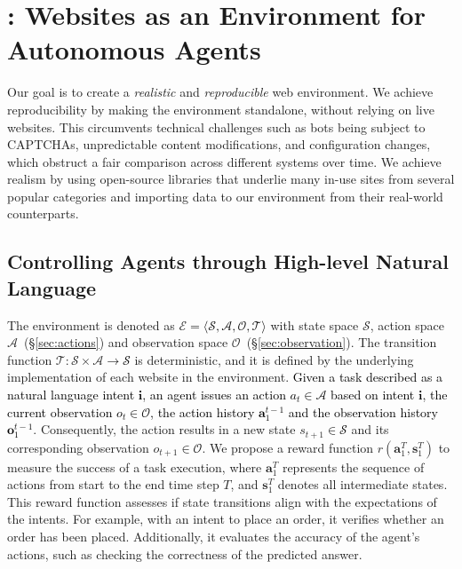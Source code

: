 \documentclass{article}
\newcommand{\rebuttal}[1]{\textcolor{black}{#1}}%
\begin{document}
\section{\ours: Websites as an Environment for Autonomous Agents}\label{sec:webarena}
Our goal is to create a \emph{realistic} and \emph{reproducible} web environment. We achieve reproducibility by making the environment standalone, without relying on live websites. This circumvents technical challenges such as bots being subject to CAPTCHAs, unpredictable content modifications, and configuration changes, which obstruct a fair comparison across different systems over time. We achieve realism by using open-source libraries that underlie many in-use sites from several popular categories and importing data to our environment from their real-world counterparts.

\subsection{Controlling Agents through High-level Natural Language}
The \ours environment is denoted as $\mathcal{E}$\textcolor{black}{$=\langle \mathcal{S},\mathcal{A},\mathcal{O},\mathcal{T} \rangle$} with state space $\mathcal{S}$, action space $\mathcal{A}$~(\S\ref{sec:actions}) and observation space $\mathcal{O}$~(\S\ref{sec:observation}).
The transition function $\mathcal{T}: \mathcal{S} \times \mathcal{A}$\textcolor{black}{$\longrightarrow \mathcal{S}$} is deterministic, and it is defined by the underlying implementation of each website in the environment.
\rebuttal{Given a task described as a natural language intent $\mathbf{i}$, an agent issues an action $a_t$\textcolor{black}{$\in \mathcal{A}$} based on intent $\mathbf{i}$, the current observation $o_t$\textcolor{black}{$\in \mathcal{O}$}, the action history $\mathbf{a}_{1}^{t-1}$ and the observation history~$\mathbf{o}_{1}^{t-1}$}.
Consequently, the action results in a new state $s_{t+1}$\textcolor{black}{$\in \mathcal{S}$} and its corresponding observation $o_{t+1}$\textcolor{black}{$\in \mathcal{O}$}. 
We propose a reward function $r(\mathbf{a}_{1}^{T}, \mathbf{s}_{1}^{T})$ to measure the success of a task execution, where $\mathbf{a}_{1}^{T}$ represents the sequence of actions from start to the end time step $T$, and $\mathbf{s}_{1}^{T}$ denotes all intermediate states. 
This reward function assesses if state transitions align with the expectations of the intents. For example, with an intent to place an order, it verifies whether an order has been placed. Additionally, it evaluates the accuracy of the agent's actions, such as checking the correctness of the predicted answer.
\end{document}
